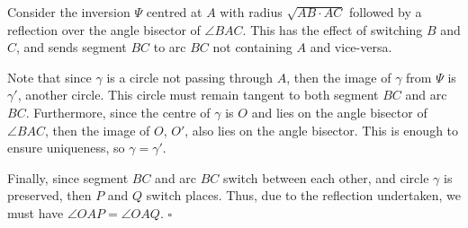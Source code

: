 \documentclass[10pt]{article}
\begin{document}
	Consider the inversion $\Psi$ centred at $A$ with radius $\sqrt{AB \cdot AC}$ followed by a reflection over the angle bisector of $\angle BAC$. This has the effect of switching $B$ and $C$, and sends segment $BC$ to arc $BC$ not containing $A$ and vice-versa.

Note that since $\gamma$ is a circle not passing through $A$, then the image of $\gamma$ from $\Psi$ is $\gamma'$, another circle. This circle must remain tangent to both segment $BC$ and arc $BC$. Furthermore, since the centre of $\gamma$ is $O$ and lies on the angle bisector of $\angle BAC$, then the image of $O$, $O'$, also lies on the angle bisector. This is enough to ensure uniqueness, so $\gamma = \gamma'$. 

Finally, since segment $BC$ and arc $BC$ switch between each other, and circle $\gamma$ is preserved, then $P$ and $Q$ switch places. Thus, due to the reflection undertaken, we must have $\angle OAP = \angle OAQ$. \hfill\ensuremath{\square}
	
	
\end{document}
